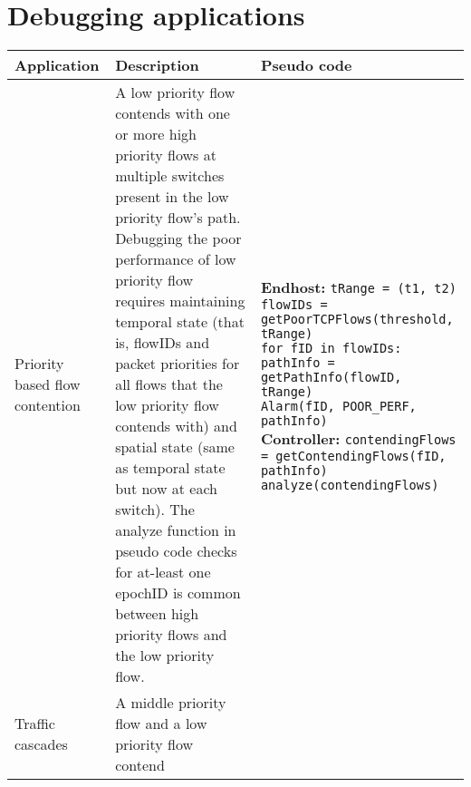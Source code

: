 
\newpage
\section{Debugging applications}
\begin{table}[!h]
\centering
{\small
{}
\begin{tabular}{C{2cm} L{6cm} L{9cm}}
\toprule
  \textbf{Application}  &  \textbf{Description}  &  \textbf{Pseudo code} \\
  \midrule \midrule
  Priority based flow contention  &  A low priority
  						flow contends with one or more high priority flows at multiple
  						switches present in the low priority flow's path. Debugging the poor performance of low priority flow requires maintaining temporal state (that is, flowIDs and packet priorities for all flows that the low priority flow contends with)
  						and spatial state (same as temporal state but now at each switch). \newline
  						The analyze function in pseudo code checks for at-least one 
  						epochID is common between high priority flows and the low priority flow. 
  					&	\textbf{Endhost:} \newline
  						\texttt{tRange = (t1, t2) \newline
  						flowIDs = getPoorTCPFlows(threshold, tRange) \newline
						for fID in flowIDs: \newline
						\hspace{0.3cm} pathInfo = getPathInfo(flowID, tRange) \newline
						\hspace{0.3cm} Alarm(fID, POOR\_PERF, pathInfo) \newline }
						\textbf{Controller:} \newline
						\texttt{contendingFlows = getContendingFlows(fID, \newline
						\hspace{6cm} pathInfo) \newline
						analyze(contendingFlows) }	\\					
	\midrule
 Traffic cascades  &    A middle priority flow and a low priority flow contend 

\end{tabular}}
\end{table}
